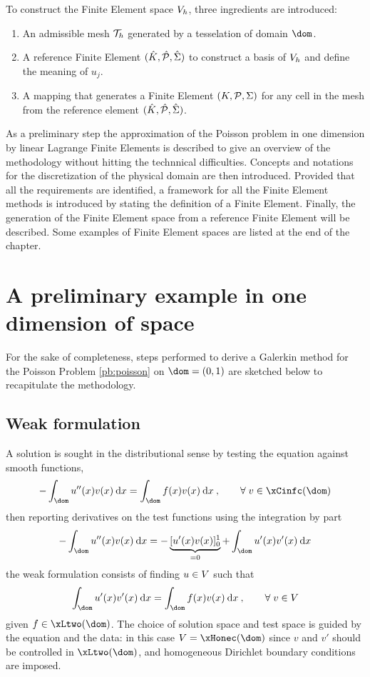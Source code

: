 \medskip
To construct the Finite Element space ${{V}}_h$, three ingredients are introduced:
\begin{enumerate}
\item An admissible mesh ${\mathcal T}_h$ generated by a tesselation of domain $\dom$.
\item A reference Finite Element ${({\hat {{K}}},{\hat {{\mathcal P}}}, {\hat{{\Sigma}}})}$ to construct a basis of ${{V}}_h$ and define the meaning of $u_j$.
\item A mapping that generates a Finite Element ${({K},{\mathcal P}, {\Sigma})}$ for any cell in the mesh from the reference element ${({\hat {{K}}},{\hat {{\mathcal P}}}, {\hat{{\Sigma}}})}$.
\end{enumerate}

\medskip
As a preliminary step the approximation of the Poisson problem in one dimension by linear Lagrange Finite Elements is described to give an overview of the methodology without hitting the technnical difficulties.
Concepts and notations for the discretization of the physical domain are then introduced.
Provided that all the requirements are identified, a framework for all the Finite Element methods is introduced by stating the definition of a Finite Element.
Finally, the generation of the Finite Element space from a reference Finite Element will be described.
Some examples of Finite Element spaces are listed at the end of the chapter.

\section{A preliminary example in one dimension of space}

For the sake of completeness, steps performed to derive a Galerkin method for the Poisson Problem \ref{pb:poisson} on $\dom = (0, 1)$ are sketched below to recapitulate the methodology.

\subsection{Weak formulation}

A solution is sought in the distributional sense by testing the equation against smooth functions,
\begin{equation*}
- \int_\dom u''(x) v(x) \md x = \int_\dom f(x) v(x) \md x\:,\qquad\forany v \in \xCinfc(\dom)
\end{equation*}
then reporting derivatives on the test functions using the integration by part
\begin{equation*}
- \int_\dom u''(x) v(x) \md x = - \underbrace{[u'(x)v(x)]_0^1}_{= 0} + \int_\dom u'(x) v'(x) \md x
\end{equation*}
the weak formulation consists of finding $u\in{V}$ such that
\begin{equation*}
\int_\dom u'(x) v'(x) \md x = \int_\dom f(x) v(x) \md x\:,\qquad\forany v \in \xV
\end{equation*}
given $f \in \xLtwo(\dom)$.
The choice of solution space and test space is guided by the equation and the data: in this case $\xV = \xHonec(\dom)$ since $v$ and $v'$ should be controlled in $\xLtwo(\dom)$, and homogeneous Dirichlet boundary conditions are imposed.

